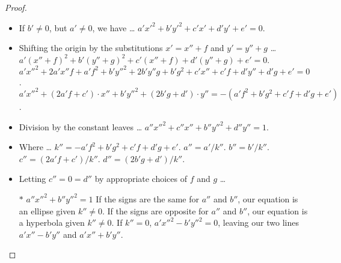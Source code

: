 \documentclass[12pt]{article}
\newcommand{\ds}{\displaystyle}
\theoremstyle{plain}
\begin{document}
\begin{proof}
  \ \\

  \begin{itemize}
    \item If $ b' \neq 0 $, but $ a' \neq 0 $, we have \dots
    \subitem $ \ds a'x'^{2} + b'y'^{2} + c'x' + d'y' + e' = 0 $.
    \item Shifting the origin by the substitutions $ x' = x'' + f $ and $ y' = y'' + g $ \dots
    \subitem $ \ds a'(x'' + f)^{2} + b'(y'' + g)^{2} + c'(x'' + f) + d'(y'' + g) + e' = 0 $.
    \subitem $ \ds a'x''^{2} + 2a'x''f + a'f^{2} + b'y''^{2} + 2b'y''g + b'g^{2} + c'x'' + c'f + d'y'' + d'g + e' = 0 $.
    \subitem $ \ds a'x''^{2} + ( 2a'f + c' ) \cdot x'' + b'y''^{2} + ( 2b'g + d' ) \cdot y'' = - ( a'f^{2} + b'g^{2} + c'f + d'g + e' ) $.
    \item Division by the constant leaves \dots 
    \subitem $ \ds a''x''^{2} + c''x'' + b''y''^{2} + d''y'' = 1 $.
    \item Where \dots
    \subitem $ \ds k'' = - a'f^{2} + b'g^{2} + c'f + d'g + e' $.
    \subitem $ \ds a'' = a' / k'' $.
    \subitem $ \ds b'' = b' / k'' $.
    \subitem $ \ds c'' = ( 2a'f + c' ) / k'' $.
    \subitem $ \ds d'' = ( 2b'g + d' ) / k'' $.
    \item Letting $ c'' = 0 = d'' $ by appropriate choices of $ f $ and $ g $ \dots
    \item[$\ast$] $ \ds a''x''^{2} + b''y''^{2} = 1 $
    \subitem If the signs are the same for $ a'' $ and $ b'' $, our equation is an ellipse given $ k'' \neq 0 $.
    \subitem If the signs are opposite for $ a'' $ and $ b'' $, our equation is a hyperbola given $ k'' \neq 0 $.
    \subitem If $ k'' = 0 $, $ \ds a'x''^{2} - b'y''^{2} = 0 $, leaving our two lines $ a'x'' - b'y'' $ and $ a'x'' + b'y'' $.
  \end{itemize}

\end{proof}

\newpage
\end{document}
